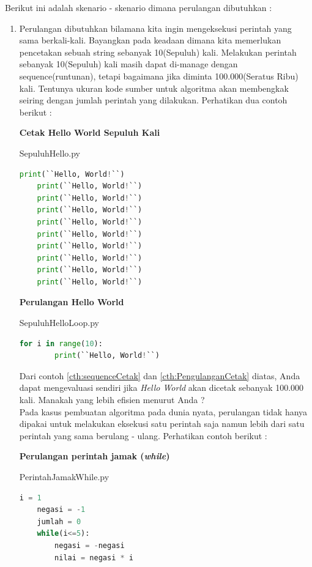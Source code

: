 Berikut ini adalah skenario - skenario dimana perulangan dibutuhkan : 
\begin{enumerate}
	\item Perulangan dibutuhkan bilamana kita ingin mengeksekusi perintah yang sama berkali-kali. Bayangkan pada keadaan dimana kita memerlukan pencetakan sebuah string sebanyak 10(Sepuluh) kali. Melakukan perintah sebanyak 10(Sepuluh) kali masih dapat di-manage dengan sequence(runtunan), tetapi bagaimana jika diminta 100.000(Seratus Ribu) kali. Tentunya ukuran kode sumber untuk algoritma akan membengkak seiring dengan jumlah perintah yang dilakukan. Perhatikan dua contoh berikut :
	
\begin{contoh}
	\label{cth:sequenceCetak}
	\textbf{Cetak Hello World Sepuluh Kali}
\begin{listprog}{SepuluhHello.py}
\label{lst:SepuluhHello}
\begin{lstlisting}[language=Python]
	print(``Hello, World!``)
	print(``Hello, World!``)
	print(``Hello, World!``)
	print(``Hello, World!``)
	print(``Hello, World!``)
	print(``Hello, World!``)
	print(``Hello, World!``)
	print(``Hello, World!``)
	print(``Hello, World!``)
	print(``Hello, World!``)
\end{lstlisting}
\end{listprog}
\end{contoh}

\begin{contoh}
	\label{cth:PengulanganCetak}
	\textbf{Perulangan Hello World}
\begin{listprog}{SepuluhHelloLoop.py}
\label{lst:SepuluhHelloLoop}
\begin{lstlisting}[language=Python]
	for i in range(10):
		print(``Hello, World!``)
\end{lstlisting}
\end{listprog}
\end{contoh}

Dari contoh \ref{cth:sequenceCetak} dan \ref{cth:PengulanganCetak} diatas, Anda dapat mengevaluasi sendiri jika \textit{Hello World} akan dicetak sebanyak 100.000 kali. Manakah yang lebih efisien menurut Anda ? \\ 
Pada kasus pembuatan algoritma pada dunia nyata, perulangan tidak hanya dipakai untuk melakukan eksekusi satu perintah saja namun lebih dari satu perintah yang sama berulang - ulang. Perhatikan contoh berikut :

\begin{contoh}
	\label{cth:PengulanganPerintahWhile}
	\textbf{Perulangan perintah jamak (\textit{while})}
\begin{listprog}{PerintahJamakWhile.py}
\label{lst:PerintahJamakWhile}
\begin{lstlisting}[language=Python]
	i = 1
	negasi = -1
	jumlah = 0
	while(i<=5):
		negasi = -negasi
		nilai = negasi * i 
		

\end{lstlisting}
\end{listprog}
\end{contoh}
\end{enumerate}
